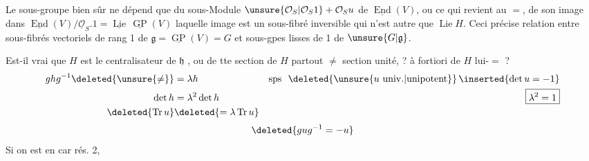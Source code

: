 Le sous-groupe  bien sûr ne dépend que du sous-Module $\unsure{\mathcal O_S|\mathcal O_S1}+\mathcal O_Su$ de $\underline{\operatorname{End}}(V)$, ou ce qui revient au $=$, de son image dans $\underline{\operatorname{End}}(V)/\underline{\mathcal O}_S.1=\underline{\operatorname{Lie}}\,\underline{\operatorname{GP}}(V)$ laquelle image est un sous-fibré inversible qui n'est autre que $\operatorname{Lie}H$. Ceci précise relation entre sous-fibrés vectoriels  de rang 1 de $\mathfrak g=\underline{\operatorname{GP}}(V)=G$ et sous-gpes lisses  de   1 de $\unsure{G|\mathfrak g}$.

Est-il vrai que $H$ est le centralisateur de $\mathfrak h$ , ou de tte section de $H$ partout $\ne$ section unité, ? à fortiori de $H$ lui-$=$ ?
\[
\begin{aligned}
ghg^{-1}\deleted{\unsure{\ne}}&=\lambda h
& \text{sps }\ \deleted{\unsure{u\ \mathrm{univ.}|\mathrm{unipotent}}}\,\inserted{\det u=-1}\\
\det h&=\lambda^2\det h & \boxed{\lambda^2=1}\\
\deleted{\operatorname{Tr}u}&\deleted{=\lambda\operatorname{Tr}u}
\end{aligned}
\]
\[
 \deleted{gug^{-1}=-u}
\]
 Si on est en car rés. 2,
